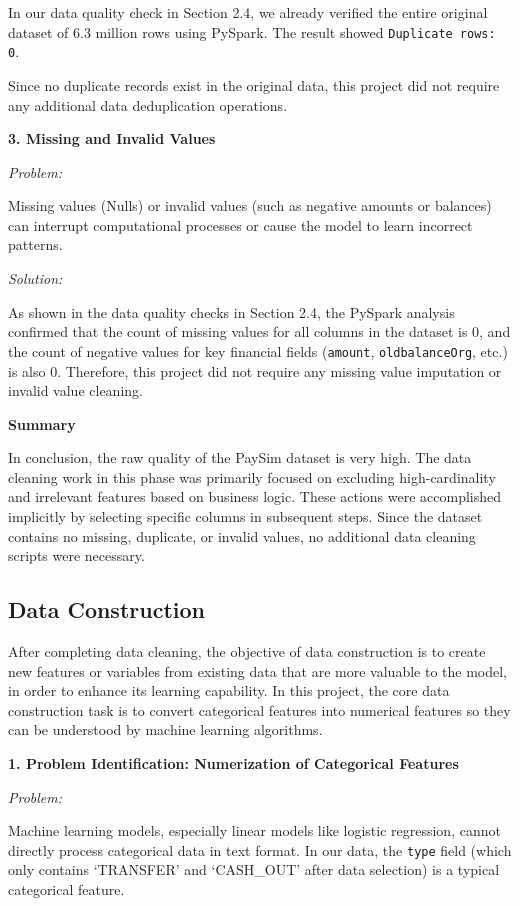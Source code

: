 \documentclass[sigplan,screen]{acmart}
\begin{document}
In our data quality check in Section 2.4, we already verified the entire original dataset of 6.3 million rows using PySpark. The result showed \texttt{Duplicate rows: 0}.

Since no duplicate records exist in the original data, this project did not require any additional data deduplication operations.

\textbf{3. Missing and Invalid Values}

\textit{Problem:}

Missing values (Nulls) or invalid values (such as negative amounts or balances) can interrupt computational processes or cause the model to learn incorrect patterns.

\textit{Solution:}

As shown in the data quality checks in Section 2.4, the PySpark analysis confirmed that the count of missing values for all columns in the dataset is 0, and the count of negative values for key financial fields (\texttt{amount}, \texttt{oldbalanceOrg}, etc.) is also 0. Therefore, this project did not require any missing value imputation or invalid value cleaning.

\textbf{Summary}

In conclusion, the raw quality of the PaySim dataset is very high. The data cleaning work in this phase was primarily focused on excluding high-cardinality and irrelevant features based on business logic. These actions were accomplished implicitly by selecting specific columns in subsequent steps. Since the dataset contains no missing, duplicate, or invalid values, no additional data cleaning scripts were necessary.

\subsection{Data Construction}

After completing data cleaning, the objective of data construction is to create new features or variables from existing data that are more valuable to the model, in order to enhance its learning capability. In this project, the core data construction task is to convert categorical features into numerical features so they can be understood by machine learning algorithms.

\textbf{1. Problem Identification: Numerization of Categorical Features}

\textit{Problem:}

Machine learning models, especially linear models like logistic regression, cannot directly process categorical data in text format. In our data, the \texttt{type} field (which only contains `TRANSFER' and `CASH\_OUT' after data selection) is a typical categorical feature.
\end{document}
